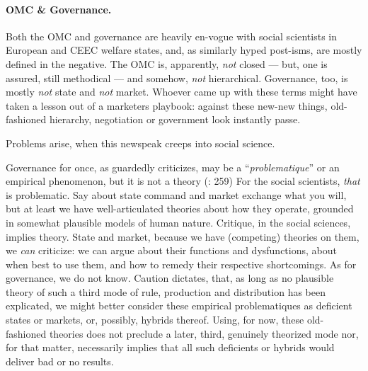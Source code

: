 \documentclass[11pt,a4paper,oneside,openright]{article}
\begin{document}
\paragraph{\gls{OMC} \& Governance.} Both the \gls{OMC} and governance are heavily en-vogue with social scientists in European and \gls{CEEC} welfare states, and, as similarly hyped post-isms, are mostly defined in the negative. 
The \gls{OMC} is, apparently, \emph{not} closed --- but, one is assured, still methodical --- and somehow, \emph{not} hierarchical. 
Governance, too, is mostly \emph{not} state and \emph{not} market. 
Whoever came up with these terms might have taken a lesson out of a marketers playbook: 
against these new-new things, old-fashioned hierarchy, negotiation or government look instantly passe. 

Problems arise, when this newspeak creeps into social science. 

Governance for once, as \citeauthor{Jachtenfuchs2001} guardedly criticizes, may be a ``\emph{problematique}'' or an empirical phenomenon, but it is not a theory (\citeyear{Jachtenfuchs2001}: 259)
For the social scientists, \emph{that} is problematic. 
Say about state command and market exchange what you will, but at least we have well-articulated theories about how they operate, grounded in somewhat plausible models of human nature. 
Critique, in the social sciences, implies theory. 
State and market, because we have (competing) theories on them, we \emph{can} criticize: 
we can argue about their functions and dysfunctions, about when best to use them, and how to remedy their respective shortcomings. 
As for governance, we do not know. 
Caution dictates, that, as long as no plausible theory of such a third mode of rule, production and distribution has been explicated, we might better consider these empirical problematiques as deficient states or markets, or, possibly, hybrids thereof. 
Using, for now, these old-fashioned theories does not preclude a later, third, genuinely theorized mode nor, for that matter, necessarily implies that all such deficients or hybrids would deliver bad or no results.
\end{document}
